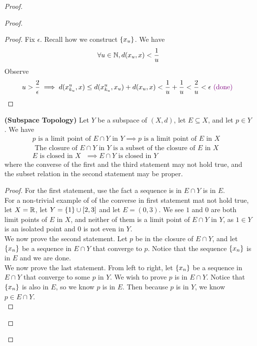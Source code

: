 \documentclass{report}
\begin{document}
\begin{proof}
\begin{proof}
\begin{proof}
Fix $\epsilon $. Recall how we construct $\{ x_u \}$. We have
\begin{equation}
\forall u\in\mathbb{N}, d(x_u,x)<\frac{1}{u}
\end{equation}
Observe  
\begin{equation}
u>\frac{2}{\epsilon }\implies d(x^u_{k_u},x)\leq d(x^u_{k_u},x_u)+d(x_u,x)<\frac{1}{u}+\frac{1}{u}<\frac{2}{u}<\epsilon \textcolor{violet}{\text{ (done) }}
\end{equation}
\end{proof}
\begin{theorem}
\label{3.2.11}
\textbf{(Subspace Topology)} Let $Y$ be a subspace of  $(X,d)$, let $E\subseteq X$, and let $p\in Y$. We have
\begin{gather}
p\text{ is a limit point of $E\cap Y$ in }Y\implies p\text{ is a limit point of $E$ in  $X$ }\\
\text{ The closure of $E\cap Y$  in $Y$ is a subset of the closure of $E$ in $X$ }\\
E\text{ is closed in $X$ }\implies  E\cap Y\text{ is closed in $Y$ }
\end{gather}
where the converse of the first and the third statement may not hold true, and the subset relation in the second statement may be proper. 
\end{theorem}
\begin{proof}
For the first statement, use the fact a sequence is in $E\cap Y$ is in $E$.\\

For a non-trivial example of of the converse in first statement mat not hold true, let $X=\mathbb{R}$, let $Y=\{ 1 \}\cup [2,3]$ and let $E=(0,3)$. We see $1$ and $0$ are both limit points of $E$ in $X$, and neither of them is a limit point of  $E\cap Y$ in $Y$, as $1\in Y$ is an isolated point and $0$ is not even in $Y$.\\

We now prove the second statement. Let $p$ be in the closure of $E\cap Y$, and let $\{ x_n \}$ be a sequence in $E\cap Y$ that converge to $p$. Notice that the sequence $\{ x_n \}$ is in $E$ and we are done.\\

We now prove the last statement. From left to right, let $\{ x_n \}$ be a sequence in $E\cap Y$ that converge to some $p$ in $Y$. We wish to prove  $p$ is in  $E\cap Y$. Notice that $\{ x_n \}$ is also in $E$, so we know  $p$ is in $E$. Then because $p$ is in $Y$, we know  $p\in  E\cap Y$.\\


\end{proof}
\end{proof}
\end{proof}
\end{document}
